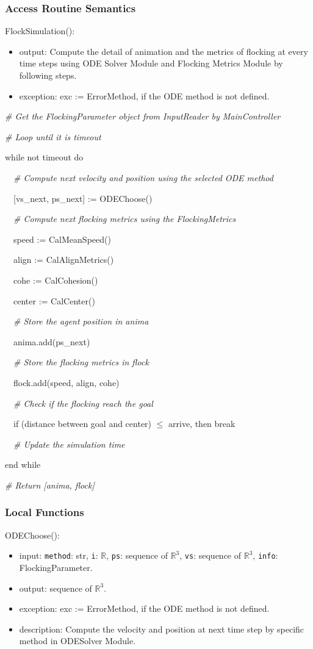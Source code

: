 \documentclass[12pt, titlepage]{article}
\begin{document}
\subsubsection{Access Routine Semantics}

\noindent FlockSimulation():
\begin{itemize}
\item output: Compute the detail of animation and the metrics of flocking at 
every time steps using ODE Solver Module and Flocking Metrics Module by 
following steps. 
\item exception: exc := ErrorMethod, if the ODE method is not defined.
\end{itemize}
\textit{\# Get the FlockingParameter object from InputReader by MainController}

\textit{\# Loop until it is timeout}

while not timeout do

\ \ \textit{\# Compute next velocity and position using the selected ODE method}

\ \ [vs\_{next}, ps\_{next}] := ODEChoose()

\ \ \textit{\# Compute next flocking metrics using the FlockingMetrics}

\ \ speed := CalMeanSpeed()

\ \ align := CalAlignMetrics()

\ \ cohe := CalCohesion()

\ \ center := CalCenter()

\ \ \textit{\# Store the agent position in anima}

\ \ anima.add(ps\_{next})

\ \ \textit{\# Store the flocking metrics in flock}

\ \ flock.add(speed, align, cohe)

\ \ \textit{\# Check if the flocking reach the goal}

\ \ if (distance between goal and center) $\leq$ arrive, then break

\ \ \textit{\# Update the simulation time}

end while

\textit{\# Return [anima, flock]}

\subsubsection{Local Functions}

\noindent ODEChoose():
\begin{itemize}
\item input: \texttt{method}: str, \texttt{i}: $\mathbb{R}$, \texttt{ps}: sequence of $\mathbb{R}^3$, 
\texttt{vs}: sequence of $\mathbb{R}^3$, \texttt{info}: FlockingParameter. 
\item output: sequence of $\mathbb{R}^3$.
\item exception: exc := ErrorMethod, if the ODE method is not defined.
\item description: Compute the velocity and position at next time step by 
specific method in ODESolver Module.
\end{itemize}
\end{document}
